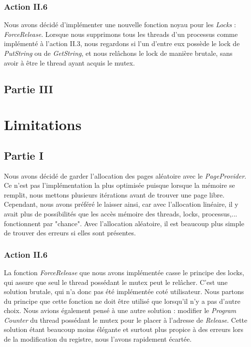 \documentclass{article}
\begin{document}
\subsubsection{Action II.6}
Nous avons décidé d'implémenter une nouvelle fonction noyau pour les \textit{Locks} : \textit{ForceRelease}. Lorsque nous supprimons tous les threads
d'un processus comme implémenté à l'action II.3, nous regardons si l'un d'entre eux possède le lock de \textit{PutString} ou  de \textit{GetString},
et nous relâchons le lock de manière brutale, sans avoir à être le thread ayant acquis le mutex.

\subsection{Partie III}


\section{Limitations}
\subsection{Partie I}
Nous avons décidé de garder l'allocation des pages aléatoire avec le \textit{PageProvider}. Ce n'est pas
l'implémentation la plus optimisée puisque lorsque la mémoire se remplit, nous mettons plusieurs itérations avant
de trouver une page libre. Cependant, nous avons préféré le laisser ainsi, car avec l'allocation linéaire, il y avait
plus de possibilités que les accès mémoire des threads, locks, processus,... fonctionnent par "chance". Avec l'allocation
aléatoire, il est beaucoup plus simple de trouver des erreurs si elles sont présentes.

\subsubsection{Action II.6}
La fonction \textit{ForceRelease} que nous avons implémentée casse le principe des locks, qui assure que seul le thread possédant le mutex peut le relâcher.
C'est une solution brutale, qui n'a donc pas été implémentée coté utilisateur. Nous partons du principe que cette fonction ne doit être utilisé que
lorsqu'il n'y a pas d'autre choix. Nous avions également pensé à une autre solution : modifier le \textit{Program Counter} du thread possédant
le mutex pour le placer à l'adresse de \textit{Release}. Cette solution étant beaucoup moins élégante et surtout plus propice à des erreurs lors de la
modification du registre, nous l'avons rapidement écartée.
\end{document}
